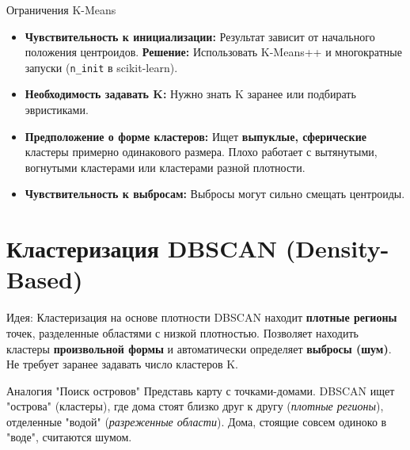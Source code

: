 \begin{alerttextbox}{Ограничения K-Means}
    \begin{itemize}[nosep, leftmargin=*]
        \item \textbf{Чувствительность к инициализации:} Результат зависит от начального положения центроидов. \textbf{Решение:} Использовать K-Means++ и многократные запуски (\texttt{n\_init} в scikit-learn).
        \item \textbf{Необходимость задавать K:} Нужно знать K заранее или подбирать эвристиками.
        \item \textbf{Предположение о форме кластеров:} Ищет \textbf{выпуклые, сферические} кластеры примерно одинакового размера. Плохо работает с вытянутыми, вогнутыми кластерами или кластерами разной плотности.
        \item \textbf{Чувствительность к выбросам:} Выбросы могут сильно смещать центроиды.
    \end{itemize}
\end{alerttextbox}

\section{Кластеризация DBSCAN (Density-Based)}

\begin{myblock}{Идея: Кластеризация на основе плотности}
    DBSCAN находит \textbf{плотные регионы} точек, разделенные областями с низкой плотностью. Позволяет находить кластеры \textbf{произвольной формы} и автоматически определяет \textbf{выбросы (шум)}. Не требует заранее задавать число кластеров K.
\end{myblock}

\begin{myexampleblock}{Аналогия "Поиск островов"}
     Представь карту с точками-домами. DBSCAN ищет "острова" (кластеры), где дома стоят близко друг к другу (\textit{плотные регионы}), отделенные "водой" (\textit{разреженные области}). Дома, стоящие совсем одиноко в "воде", считаются шумом.
\end{myexampleblock}

